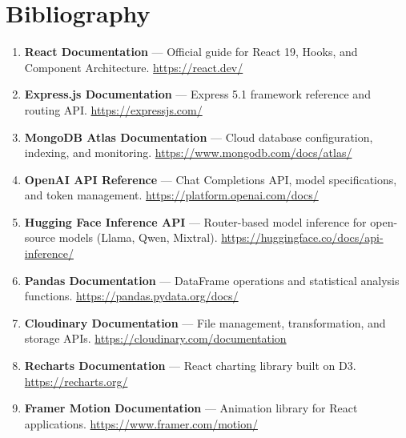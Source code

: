 \documentclass[12pt,a4paper]{article}
\begin{document}
\clearpage

\section{Bibliography}

\begin{enumerate}
    \item \textbf{React Documentation} --- Official guide for React 19, Hooks, and Component Architecture. \url{https://react.dev/}

    \item \textbf{Express.js Documentation} --- Express 5.1 framework reference and routing API. \url{https://expressjs.com/}

    \item \textbf{MongoDB Atlas Documentation} --- Cloud database configuration, indexing, and monitoring. \url{https://www.mongodb.com/docs/atlas/}

    \item \textbf{OpenAI API Reference} --- Chat Completions API, model specifications, and token management. \url{https://platform.openai.com/docs/}


    \item \textbf{Hugging Face Inference API} --- Router-based model inference for open-source models (Llama, Qwen, Mixtral). \url{https://huggingface.co/docs/api-inference/}

    \item \textbf{Pandas Documentation} --- DataFrame operations and statistical analysis functions. \url{https://pandas.pydata.org/docs/}

    \item \textbf{Cloudinary Documentation} --- File management, transformation, and storage APIs. \url{https://cloudinary.com/documentation}

    \item \textbf{Recharts Documentation} --- React charting library built on D3. \url{https://recharts.org/}

    \item \textbf{Framer Motion Documentation} --- Animation library for React applications. \url{https://www.framer.com/motion/}
\end{enumerate}
\end{document}

